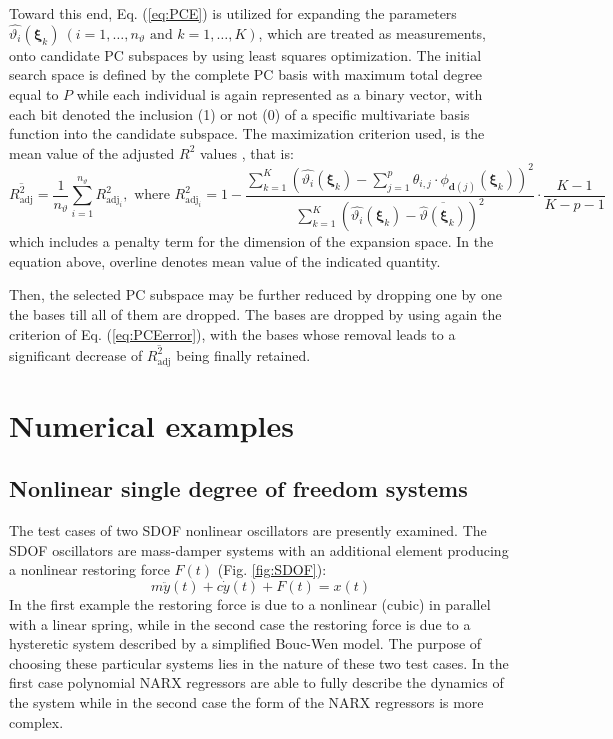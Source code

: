 \documentclass[preprint,3p,review,times,11pt]{elsarticle}
\newcommand{\beq}{\begin{equation}}
\newcommand{\eeq}{\end{equation}}
\newcommand{\bld}[1]{\boldsymbol{#1}}
\newcommand{\bxi}{\bld{\xi}}
\begin{document}
Toward this end, Eq. (\ref{eq:PCE}) is utilized for expanding the parameters $\hat{\vartheta_i} (\bxi_k)\ (i = 1,\ldots, n_\vartheta \text{ and } k = 1,\ldots, K)$, which are treated as measurements, onto candidate PC subspaces by using least squares optimization. The initial search space is defined by the complete PC basis with maximum total degree equal to $P$ while each individual is again represented as a binary vector, with each bit denoted the inclusion (1) or not (0) of a specific multivariate basis function into the candidate subspace. The maximization criterion used, is the mean value of the adjusted $R^2$ values \citep{Blatman-Sudret2010}, that is: 
%
\beq 
\overline{R^2_\text{adj}} = \frac{1}{n_\vartheta} \sum_{i=1}^{n_\vartheta} R^2_{\text{adj}_i}, \text{ where } R^2_{\text{adj}_i} = 1 - \frac{ \sum_{k=1}^K \left( \hat{\vartheta_{i}}(\bxi_k)  - \sum_{j=1}^{p} \theta_{i,j}\cdot \phi_{\bld{d}(j)}(\bxi_k) \right)^2} {\sum_{k=1}^K \left(\hat{\vartheta_{i}}(\bxi_k) - \overline{\hat{\vartheta}(\bxi_k)}\right)^2}  \cdot \frac{K-1}{K-p-1}\label{eq:PCEerror}
\eeq
%
which includes a penalty term for the dimension of the expansion space. In the equation above, overline denotes mean value of the indicated quantity.       


Then, the selected PC subspace may be further reduced by dropping one by one the bases till all of them are dropped. The bases are dropped by using again the criterion of Eq. (\ref{eq:PCEerror}), with the bases whose removal leads to a significant decrease of $\overline{R^2_\text{adj}}$ being finally retained. 





\section{Numerical examples}\label{sec:numerical}


\subsection{Nonlinear single degree of freedom systems}

The test cases of two SDOF nonlinear oscillators are presently examined. The SDOF oscillators are mass-damper systems with an additional element producing a nonlinear restoring force $F(t)$ (Fig. \ref{fig:SDOF}):
%
\beq m \ddot{y}(t) + c\dot{y}(t) + F(t) = x(t) \label{eq:SDOF}\eeq
%
In the first example the restoring force is due to a nonlinear (cubic) in parallel with a linear spring, while in the second case the restoring force is due to a hysteretic system described by a simplified Bouc-Wen model. The purpose of choosing these particular systems lies in the nature of these two test cases. In the first case polynomial NARX regressors are able to fully describe the dynamics of the system while in the second case the form of the NARX regressors is more complex.
\end{document}
